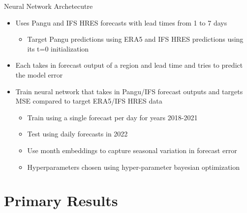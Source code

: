 \documentclass[aspectratio=169, xcolor=dvipsnames]{beamer}
\begin{document}
\begin{frame}{Neural Network Archetecutre}
\begin{itemize}
    \item Uses Pangu and IFS HRES forecasts with lead times from 1 to 7 days
    \begin{itemize}
        \item Target Pangu predictions using ERA5 and IFS HRES predictions using its t=0 initialization
    \end{itemize}
    \item Each takes in forecast output of a region and lead time and tries to predict the model error
    \item Train neural network that takes in Pangu/IFS forecast outputs and targets MSE compared to target ERA5/IFS HRES data
    \begin{itemize}
        \item Train using a single forecast per day for years 2018-2021
        \item Test using daily forecasts in 2022
        \item Use month embeddings to capture seasonal variation in forecast error
        \item Hyperparameters chosen using hyper-parameter bayesian optimization
    \end{itemize}
\end{itemize}
\end{frame}

\section{Primary Results}
\end{document}
